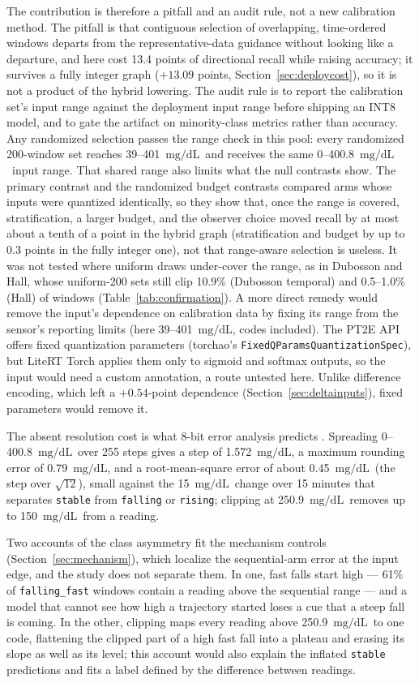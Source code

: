 \documentclass[10pt,twocolumn]{article}
\newcommand{\mgdl}{\ensuremath{\mathrm{mg/dL}}}
\begin{document}
The contribution is therefore a pitfall and an audit rule, not a new
calibration method. The pitfall is that contiguous selection of
overlapping, time-ordered windows departs from the representative-data
guidance without looking like a departure, and here cost 13.4 points of
directional recall while raising accuracy; it survives a fully integer
graph ($+13.09$ points, Section~\ref{sec:deploycost}), so it is not a
product of the hybrid lowering. The audit rule is to report the
calibration set's input range against the deployment input range before
shipping an INT8 model, and to gate the artifact on minority-class
metrics rather than accuracy. Any randomized selection passes the range
check in this pool: every randomized 200-window set reaches
39--401~\mgdl\ and receives the same 0--400.8~\mgdl\ input range. That shared range also limits what the null
contrasts show. The primary contrast and the randomized budget contrasts
compared arms whose inputs were quantized identically, so they show that,
once the range is covered, stratification, a larger budget, and the
observer choice moved recall by at most about a tenth of a point in the
hybrid graph (stratification and budget by up to 0.3 points in the fully
integer one), not that range-aware selection is useless. It was not tested where uniform draws
under-cover the range, as in Dubosson and Hall, whose uniform-200 sets
still clip 10.9\% (Dubosson temporal) and 0.5--1.0\% (Hall) of windows
(Table~\ref{tab:confirmation}).
A more direct remedy would remove the input's dependence on calibration
data by fixing its range from the sensor's reporting limits (here
39--401~\mgdl, codes included). The PT2E API offers fixed quantization
parameters (torchao's \texttt{FixedQParamsQuantizationSpec}), but LiteRT
Torch applies them only to sigmoid and softmax outputs, so the input would
need a custom annotation, a route untested here. Unlike difference
encoding, which left a $+0.54$-point dependence
(Section~\ref{sec:deltainputs}), fixed parameters would remove it.

The absent resolution cost is what 8-bit error analysis predicts
\cite{banner2019ptq,nagel2021whitepaper}. Spreading 0--400.8~\mgdl\ over
255 steps gives a step of 1.572~\mgdl, a maximum rounding error of
0.79~\mgdl, and a root-mean-square error of about 0.45~\mgdl\ (the step
over $\sqrt{12}$), small against the 15~\mgdl\ change over 15 minutes that
separates \texttt{stable} from \texttt{falling} or \texttt{rising};
clipping at 250.9~\mgdl\ removes up to 150~\mgdl\ from a reading.

Two accounts of the class asymmetry fit the mechanism controls
(Section~\ref{sec:mechanism}), which localize the sequential-arm error at
the input edge, and the study does not separate them. In one, fast falls
start high --- 61\% of
\texttt{falling\_fast} windows contain a reading above the sequential
range --- and a model that cannot see how high a trajectory started loses
a cue that a steep fall is coming. In the other, clipping maps every
reading above 250.9~\mgdl\ to one code, flattening the clipped part of a
high fast fall into a plateau and erasing its slope as well as its level;
this account would also explain the inflated \texttt{stable} predictions and fits a
label defined by the difference between readings.
\end{document}
